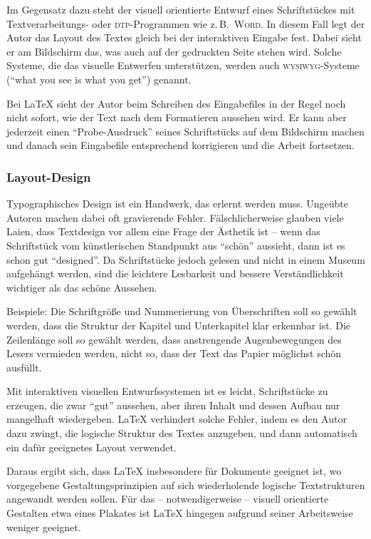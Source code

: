 Im Gegensatz dazu steht der visuell orientierte Entwurf eines
Schriftstückes mit Textverarbeitungs- oder \textsc{dtp}-Programmen wie z.\,B.\ 
\textsc{Word}.
In diesem Fall legt der Autor das Layout des Textes gleich bei der
interaktiven Eingabe fest. Dabei sieht er am Bildschirm das, was
auch auf der gedruckten Seite stehen wird. Solche Systeme, die das
visuelle Entwerfen unterstützen, werden auch \textsc{wysiwyg}-Systeme
("`what you see is what you get"') genannt.
 
Bei \LaTeX{} sieht der Autor beim Schreiben des Eingabefiles in
der Regel noch nicht sofort, wie der Text nach dem Formatieren 
aussehen wird. Er kann aber %
jederzeit einen "`Probe-Ausdruck"' seines Schriftstücks auf dem
Bildschirm machen und danach sein Eingabefile entsprechend 
korrigieren und die Arbeit fortsetzen.
 
 
\subsubsection{Layout-Design}
 
Typographisches Design ist ein Handwerk, das erlernt werden muss.
Ungeübte Autoren machen dabei oft gravierende Fehler.
Fälschlicherweise glauben viele Laien, dass Textdesign
vor allem eine Frage der Ästhetik ist -- wenn das
Schriftstück vom künstlerischen Standpunkt aus "`schön"'
aussieht, dann ist es schon gut "`designed"'.
Da Schriftstücke jedoch gelesen und nicht in einem Museum
aufgehängt werden, sind die leichtere Lesbarkeit und bessere
Verständlichkeit wichtiger als das schöne Aussehen.
 
Beispiele:
Die Schriftgröße und Nummerierung von Überschriften soll so
gewählt werden, dass die Struktur der Kapitel und Unterkapitel
klar erkennbar ist.
Die Zeilenlänge soll so gewählt werden, dass anstrengende
Augenbewegungen des Lesers vermieden werden, nicht so, dass der
Text das Papier möglichst schön ausfüllt.
 
Mit interaktiven visuellen Entwurfssystemen ist es leicht,  
Schriftstücke zu erzeugen, die zwar "`gut"' aussehen,
aber ihren Inhalt und dessen Aufbau nur mangelhaft wiedergeben.
\LaTeX{} verhindert solche
Fehler, indem es den Autor dazu zwingt, die logische
Struktur des Textes anzugeben, und dann automatisch ein dafür
geeignetes Layout verwendet.

Daraus ergibt sich, dass \LaTeX{} insbesondere für  Dokumente geeignet 
ist, wo vorgegebene Gestaltungsprinzipien auf sich wiederholende
logische Textstrukturen angewandt werden sollen. 
Für das -- notwendigerweise -- visuell orientierte Gestalten
etwa eines Plakates ist \LaTeX{} hingegen 
aufgrund seiner Arbeitsweise weniger geeignet.

